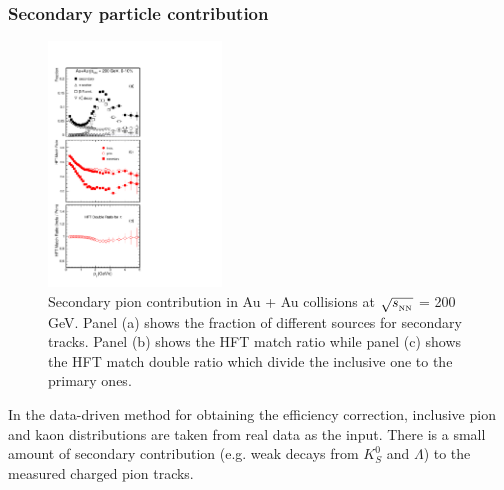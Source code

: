 \documentclass[%
 reprint,	
 amsmath,amssymb,
 aps,
 prc,
]{revtex4-1}
\begin{document}
\subsubsection{\label{sec:correction:hft:secondary}Secondary particle contribution}

\begin{figure}[h]
\centering
\includegraphics[width=0.41\textwidth, angle = 0]{fig/Fraction_Pion.pdf}
\caption{Secondary pion contribution in Au + Au collisions at $\sqrt{s_{_{\rm NN}}}$ = 200\,GeV. Panel (a) shows the fraction of different sources for secondary tracks. Panel (b) shows the HFT match ratio while panel (c) shows the HFT match double ratio which divide the inclusive one to the primary ones.}
\label{fig:Fraction_Pion} 
\end{figure}

In the data-driven method for obtaining the efficiency correction, inclusive pion and kaon distributions are taken from real data as the input. There is a small amount of secondary contribution (e.g. weak decays from $K^0_S$ and $\Lambda$) to the measured charged pion tracks.
\end{document}
